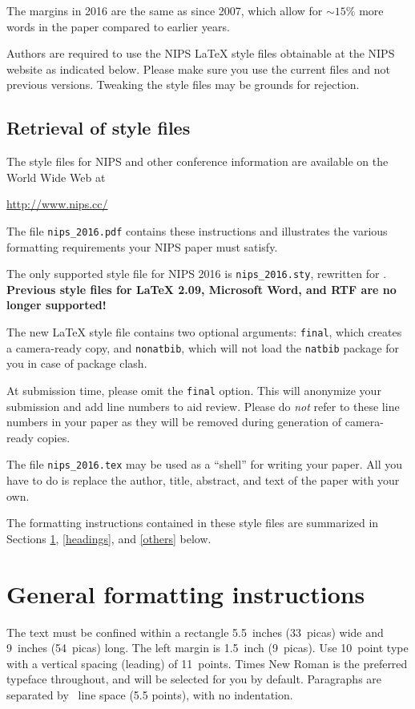 \documentclass{article}
\begin{document}
The margins in 2016 are the same as since 2007, which allow for
$\sim$$15\%$ more words in the paper compared to earlier years.

Authors are required to use the NIPS \LaTeX{} style files obtainable
at the NIPS website as indicated below. Please make sure you use the
current files and not previous versions. Tweaking the style files may
be grounds for rejection.

\subsection{Retrieval of style files}

The style files for NIPS and other conference information are
available on the World Wide Web at
\begin{center}
  \url{http://www.nips.cc/}
\end{center}
The file \verb+nips_2016.pdf+ contains these instructions and
illustrates the various formatting requirements your NIPS paper must
satisfy.

The only supported style file for NIPS 2016 is \verb+nips_2016.sty+,
rewritten for \LaTeXe{}.  \textbf{Previous style files for \LaTeX{}
  2.09, Microsoft Word, and RTF are no longer supported!}

The new \LaTeX{} style file contains two optional arguments:
\verb+final+, which creates a camera-ready copy, and \verb+nonatbib+,
which will not load the \verb+natbib+ package for you in case of
package clash.

At submission time, please omit the \verb+final+ option. This will
anonymize your submission and add line numbers to aid review.  Please
do \emph{not} refer to these line numbers in your paper as they will
be removed during generation of camera-ready copies.

The file \verb+nips_2016.tex+ may be used as a ``shell'' for writing
your paper. All you have to do is replace the author, title, abstract,
and text of the paper with your own.

The formatting instructions contained in these style files are
summarized in Sections \ref{gen_inst}, \ref{headings}, and
\ref{others} below.

\section{General formatting instructions}
\label{gen_inst}

The text must be confined within a rectangle 5.5~inches (33~picas)
wide and 9~inches (54~picas) long. The left margin is 1.5~inch
(9~picas).  Use 10~point type with a vertical spacing (leading) of
11~points.  Times New Roman is the preferred typeface throughout, and
will be selected for you by default.  Paragraphs are separated by
~line space (5.5 points), with no indentation.
\end{document}
